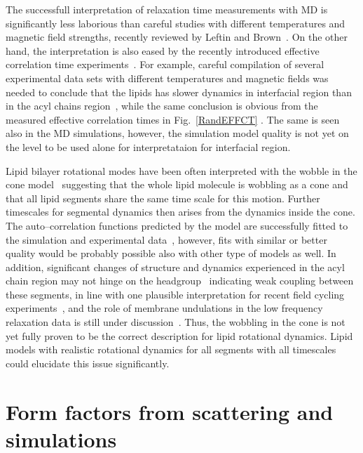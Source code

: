 \documentclass[aps,prl,superscriptaddress,twocolumn]{revtex4}
\begin{document}
The successfull interpretation of relaxation time measurements with MD is significantly less laborious
than careful studies with different temperatures and magnetic field strengths, recently reviewed by 
Leftin and Brown~\cite{leftin11}. On the other hand, the interpretation is also eased by  
the recently introduced effective correlation time experiments~\cite{ferreira15}.
For example, careful compilation of several experimental data sets with different
temperatures and magnetic fields was needed to conclude that the lipids has slower dynamics in
interfacial region than in the acyl chains region~\cite{leftin11}, while the same conclusion
is obvious from the measured effective correlation times in Fig.~\ref{RandEFFCT} \cite{ferreira15}.
The same is seen also in the MD simulations, however, the simulation model quality is not
yet on the level to be used alone for interpretataion for interfacial region.

Lipid bilayer rotational modes have been often interpreted with the 
wobble in the cone model~\cite{pastor88,pastor02,klauda08a,klauda08c,sivanandam09} suggesting
that the whole lipid molecule is wobbling as a cone and that all lipid segments share the same time scale for 
this motion. Further timescales for segmental dynamics then arises from the dynamics inside the cone. 
The auto--correlation functions predicted by the model are successfully fitted to the simulation and 
experimental data~\cite{pastor88,pastor02,klauda08a,klauda08c,sivanandam09}, however,
fits with similar or better quality would be probably possible also with other type of models as well.
In addition, significant changes of structure and dynamics experienced in the acyl chain region may not 
hinge on the headgroup~\cite{ferreiraTHESIS,botan15} indicating weak coupling 
between these segments, in line with one plausible interpretation for recent field cycling 
experiments~\cite{roberts09}, and the role of membrane undulations in the low frequency 
relaxation data is still under discussion~\cite{leftin11,edholm08,klauda08a,klauda08c}.
Thus, the wobbling in the cone is not yet fully proven to be the correct description for lipid
rotational dynamics. Lipid models with realistic rotational dynamics for all segments 
with all timescales could elucidate this issue significantly.







\section{Form factors from scattering and simulations}
\end{document}
